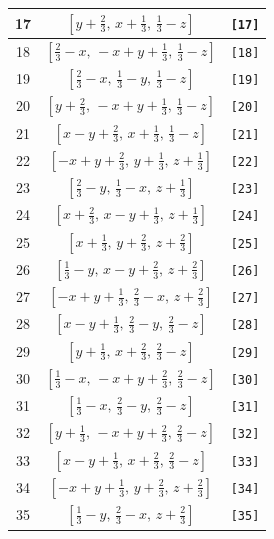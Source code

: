 \documentclass[fleqn,8pt]{jsarticle}
\begin{document}
\begin{longtable}{ccc}
17 & $\left[ y + \frac{2}{3},\, x + \frac{1}{3},\, \frac{1}{3} - z \right]$ & {\tt [17]} \\ \hline
18 & $\left[ \frac{2}{3} - x,\, - x + y + \frac{1}{3},\, \frac{1}{3} - z \right]$ & {\tt [18]} \\ \hline
19 & $\left[ \frac{2}{3} - x,\, \frac{1}{3} - y,\, \frac{1}{3} - z \right]$ & {\tt [19]} \\ \hline
20 & $\left[ y + \frac{2}{3},\, - x + y + \frac{1}{3},\, \frac{1}{3} - z \right]$ & {\tt [20]} \\ \hline
21 & $\left[ x - y + \frac{2}{3},\, x + \frac{1}{3},\, \frac{1}{3} - z \right]$ & {\tt [21]} \\ \hline
22 & $\left[ - x + y + \frac{2}{3},\, y + \frac{1}{3},\, z + \frac{1}{3} \right]$ & {\tt [22]} \\ \hline
23 & $\left[ \frac{2}{3} - y,\, \frac{1}{3} - x,\, z + \frac{1}{3} \right]$ & {\tt [23]} \\ \hline
24 & $\left[ x + \frac{2}{3},\, x - y + \frac{1}{3},\, z + \frac{1}{3} \right]$ & {\tt [24]} \\ \hline
25 & $\left[ x + \frac{1}{3},\, y + \frac{2}{3},\, z + \frac{2}{3} \right]$ & {\tt [25]} \\ \hline
26 & $\left[ \frac{1}{3} - y,\, x - y + \frac{2}{3},\, z + \frac{2}{3} \right]$ & {\tt [26]} \\ \hline
27 & $\left[ - x + y + \frac{1}{3},\, \frac{2}{3} - x,\, z + \frac{2}{3} \right]$ & {\tt [27]} \\ \hline
28 & $\left[ x - y + \frac{1}{3},\, \frac{2}{3} - y,\, \frac{2}{3} - z \right]$ & {\tt [28]} \\ \hline
29 & $\left[ y + \frac{1}{3},\, x + \frac{2}{3},\, \frac{2}{3} - z \right]$ & {\tt [29]} \\ \hline
30 & $\left[ \frac{1}{3} - x,\, - x + y + \frac{2}{3},\, \frac{2}{3} - z \right]$ & {\tt [30]} \\ \hline
31 & $\left[ \frac{1}{3} - x,\, \frac{2}{3} - y,\, \frac{2}{3} - z \right]$ & {\tt [31]} \\ \hline
32 & $\left[ y + \frac{1}{3},\, - x + y + \frac{2}{3},\, \frac{2}{3} - z \right]$ & {\tt [32]} \\ \hline
33 & $\left[ x - y + \frac{1}{3},\, x + \frac{2}{3},\, \frac{2}{3} - z \right]$ & {\tt [33]} \\ \hline
34 & $\left[ - x + y + \frac{1}{3},\, y + \frac{2}{3},\, z + \frac{2}{3} \right]$ & {\tt [34]} \\ \hline
35 & $\left[ \frac{1}{3} - y,\, \frac{2}{3} - x,\, z + \frac{2}{3} \right]$ & {\tt [35]} \\ \hline

\end{longtable}
\end{document}
